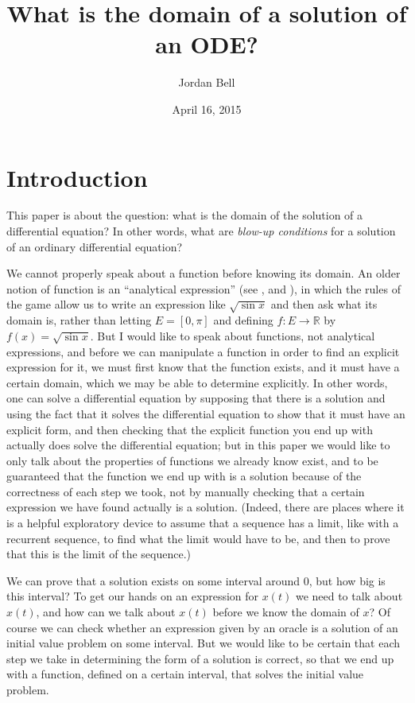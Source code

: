 \documentclass{article}
\theoremstyle{definition}
\begin{document}
\title{What is the domain of a solution of an ODE?}
\author{Jordan Bell}
\date{April 16, 2015}

\maketitle

\section{Introduction}
This paper is about the question: what is the domain of the solution of a differential equation? In other words, what are {\em blow-up conditions} for a solution of an ordinary differential equation?


We cannot properly speak about a function before knowing its domain. An older notion of function is an ``analytical expression'' (see \cite[p.~61]{MR0497639}, \cite{kleiner} and \cite[Chapter 5]{stewart}), in which the rules of the game
allow us to write an expression like $\sqrt{\sin x}$ and then ask what its domain is, rather than letting $E=[0,\pi]$ and defining $f:E \to \mathbb{R}$ by
$f(x)=\sqrt{\sin x}$. But I would like to speak about functions, not analytical expressions, and before we can manipulate a function in order to find an explicit expression for it, we must first know that the function exists, and it must have a 
certain domain, which we may be able to  determine explicitly. In other words, one can solve a differential equation by supposing that there is a solution and using the fact
that it solves the differential equation to show that it must have an explicit form, and then checking that the explicit function you end up with actually does solve the differential equation;
but in this paper we would like to only talk about the properties of functions we already know exist, and to be guaranteed that the function we end up with is a solution because
of the correctness of each step we took, not by manually checking that a certain expression we have found actually is a solution. (Indeed, there are places where it is a helpful
exploratory device to assume that a sequence has a limit, like with a recurrent sequence, to find what the limit would have to be, and then to prove that this is the limit of the sequence.)



We can prove that a solution exists on some interval around $0$, but how big is this interval? 
To get our hands on an expression for $x(t)$
we need to talk about $x(t)$, and how can we talk about $x(t)$ before we know the domain of $x$? Of course
we can check whether an expression given by an oracle is a solution of an initial value problem on some interval. But we would like to
be certain that each step we take in determining the form of a solution is correct, so that we end up with a function, defined on a certain interval, that solves
the initial value problem.
\end{document}
